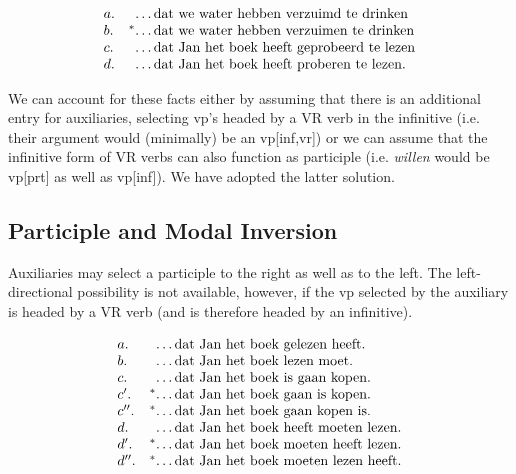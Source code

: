 \begin{equation}
\begin{array}[t]{ll@{\hspace{0cm}}l}
a. && \ldots\mbox{dat we water hebben verzuimd te drinken} \\
b. &^*& \ldots\mbox{dat we water hebben verzuimen te drinken} \\
c. && \ldots\mbox{dat Jan het boek heeft geprobeerd te lezen} \\
d. && \ldots\mbox{dat Jan het boek heeft proberen te lezen.} \\
\end{array}
\end{equation}

\noindent We can account for these facts either by assuming that there is an
additional entry for auxiliaries, selecting {\sc vp}'s headed by a VR verb in
the infinitive (i.e.  their argument would (minimally) be an {\sc vp[inf,vr]})
or we can assume that the infinitive form of VR verbs can also function as
participle (i.e.  {\em willen} would be {\sc vp[prt]} as well as {\sc vp[inf]}).
We have adopted the latter solution.

\subsection{Participle and Modal Inversion}

Auxiliaries may select a participle to the right as well as to the left. The 
left-directional possibility is not available, however, if the {\sc vp} selected 
by the auxiliary is headed by a VR verb (and is therefore headed by an 
infinitive).

\begin{equation}
\label{ipp-inv}
\begin{array}[t]{ll@{\hspace{0cm}}l}
a. && \ldots\mbox{dat Jan  het boek gelezen heeft.} \\
b. && \ldots\mbox{dat Jan het boek lezen moet.} \\
c. && \ldots\mbox{dat Jan het boek is gaan kopen.} \\
c^\prime. &^*& \ldots\mbox{dat Jan het boek gaan is kopen.} \\
c^{\prime\prime}. &^*& \ldots\mbox{dat Jan het boek gaan kopen is.} \\
d. && \ldots\mbox{dat Jan het boek heeft moeten lezen.} \\
d^\prime. &^*& \ldots\mbox{dat Jan het boek moeten heeft lezen.} \\
d^{\prime\prime}. &^*& \ldots\mbox{dat Jan het boek moeten lezen heeft.} \\
\end{array}
\end{equation} 

